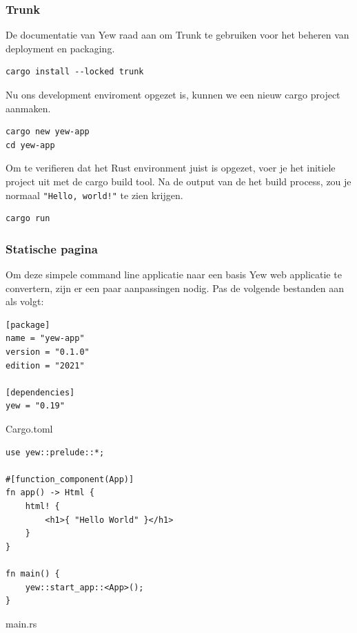 \clearpage

\subsubsection{Trunk}

De documentatie van Yew raad aan om Trunk te gebruiken voor het beheren van deployment en packaging.

\begin{verbatim}
cargo install --locked trunk
\end{verbatim}

Nu ons development enviroment opgezet is, kunnen we een nieuw cargo project aanmaken.

\begin{verbatim}
cargo new yew-app
cd yew-app
\end{verbatim}

Om te verifieren dat het Rust environment juist is opgezet, voer je het initiele project uit met de
cargo build tool. Na de output van de het build process, zou je normaal \texttt{"Hello,
world!"} te zien
krijgen.

\begin{verbatim}
cargo run
\end{verbatim}

\subsubsection{Statische pagina}

Om deze simpele command line applicatie naar een basis Yew web applicatie te convertern, zijn er een
paar aanpassingen nodig. Pas de volgende bestanden aan als volgt:

\begin{listing}[h]
\begin{verbatim}
[package]
name = "yew-app"
version = "0.1.0"
edition = "2021"

[dependencies]
yew = "0.19"
\end{verbatim}
\caption{Cargo.toml}
\end{listing}

\clearpage

\begin{listing}[h]
\begin{verbatim}
use yew::prelude::*;

#[function_component(App)]
fn app() -> Html {
    html! {
        <h1>{ "Hello World" }</h1>
    }
}

fn main() {
    yew::start_app::<App>();
}
\end{verbatim}
\caption{main.rs}
\end{listing}

